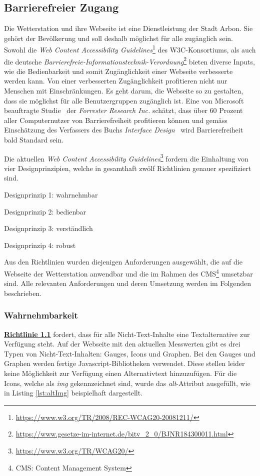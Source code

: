 \subsection{Barrierefreier Zugang}
Die Wetterstation und ihre Webseite ist eine Dienstleistung der Stadt Arbon. Sie gehört der Bevölkerung und soll deshalb möglichst für alle zugänglich sein. Sowohl die \emph{Web Content Accessibility Guidelines}\footnote{ \url{https://www.w3.org/TR/2008/REC-WCAG20-20081211/}} des W3C-Konsortiums, als auch die deutsche \emph{Barrierefreie-Informationstechnik-Verordnung}\footnote{ \url{https://www.gesetze-im-internet.de/bitv_2_0/BJNR184300011.html}} bieten diverse Inputs, wie die Bedienbarkeit und somit Zugänglichkeit einer Webseite verbesserte werden kann. Von einer verbesserten Zugänglichkeit profitieren nicht nur Menschen mit Einschränkungen. Es geht darum, die Webseite so zu gestalten, dass sie möglichst für alle Benutzergruppen zugänglich ist. Eine von Microsoft beauftragte Studie~\cite{ForresterResearch2004E:Abilities} der \emph{Forrester Research Inc.} schätzt, dass über 60 Prozent aller Computernutzer von Barrierefreiheit profitieren können und gemäss Einschätzung des Verfassers des Buchs \emph{Interface Design}~\cite{ThesmannStephan2016ID:U} wird Barrierefreiheit bald Standard sein.

\noindent
Die aktuellen \emph{Web Content Accessibility Guidelines}\footnote{\url{https://www.w3.org/TR/WCAG20/}} fordern die Einhaltung von vier Designprinzipien, welche in gesamthaft zwölf Richtlinien genauer spezifiziert sind.

\begin{itemize*}
\item Designprinzip 1: wahrnehmbar
\item Designprinzip 2: bedienbar
\item Designprinzip 3: verständlich
\item Designprinzip 4: robust
\end{itemize*}

\noindent
Aus den Richtlinien wurden diejenigen Anforderungen ausgewählt, die auf die Webseite der Wetterstation anwendbar und die im Rahmen des CMS\footnote{CMS: Content Management System} umsetzbar sind. Alle relevanten Anforderungen und deren Umsetzung werden im Folgenden beschrieben.

\subsubsection{Wahrnehmbarkeit}
\href{https://www.w3.org/Translations/WCAG20-de/#text-equiv}{\textbf{Richtlinie 1.1}} fordert, dass für alle Nicht-Text-Inhalte eine Textalternative zur Verfügung steht. Auf der Webseite mit den aktuellen Messwerten gibt es drei Typen von Nicht-Text-Inhalten: Gauges, Icons und Graphen. Bei den Gauges und Graphen werden fertige Javascript-Bibliotheken verwendet. Diese stellen leider keine Möglichkeit zur Verfügung einen Alternativtext hinzuzufügen. Für die Icons, welche als \textit{img} gekennzeichnet sind, wurde das \textit{alt}-Attribut ausgefüllt, wie in Listing \ref{lst:altImg} beispielhaft dargestellt.

